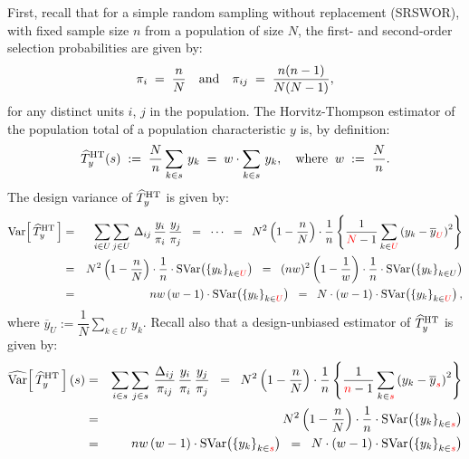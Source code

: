 First, recall that for a simple random sampling without replacement (SRSWOR),
with fixed sample size $n$ from a population of size $N$,
the first- and second-order selection probabilities are given by: 
\begin{equation*}
\pi_{i}\;=\;\dfrac{n}{N}
\quad\textnormal{and}\quad
\pi_{ij}\;=\;\dfrac{n(n-1)}{N(N-1)},
\end{equation*}
for any distinct units $i$, $j$ in the population.
The Horvitz-Thompson estimator of the population total of a population characteristic $y$ is, by definition:
\begin{equation*}
\widehat{T}^{\textnormal{HT}}_{y}(s)
\;:=\;\dfrac{N}{n}\sum_{k \in s}\,y_{k}
\;=\; w\cdot\sum_{k \in s}\,y_{k},
\quad\textnormal{where}\;\; w\;:=\;\dfrac{N}{n}.
\end{equation*}
The design variance of $\widehat{T}^{\textnormal{HT}}_{y}$ is given by:
\begin{eqnarray*}
\textnormal{Var}\!\left[\,\widehat{T}^{\textnormal{HT}}_{y}\,\right]
&=& \sum_{i\in U}\sum_{j\in U}\,\Delta_{ij}\,\frac{y_{i}}{\pi_{i}}\,\frac{y_{j}}{\pi_{j}}
\;\;=\;\; \cdots \;\;=\;\; N^{2}\left(1-\dfrac{n}{N}\right)\cdot\dfrac{1}{n}\left\{\dfrac{1}{{\color{red}N}-1}\sum_{k \in{\color{red}U}}\left(y_{k}-\overline{y}_{\color{red}U}\right)^{2}\right\} \\
&=& N^{2}\left(1-\dfrac{n}{N}\right)\cdot\dfrac{1}{n}\cdot\textnormal{SVar}\!\left(\left\{y_{k}\right\}_{k\in{\color{red}U}}\right)
\;\;=\;\; (nw)^{2}\left(1-\dfrac{1}{w}\right)\cdot\dfrac{1}{n}\cdot\textnormal{SVar}\!\left(\left\{y_{k}\right\}_{k\in U}\right) \\
&=& nw\left(w-1\right)\cdot\textnormal{SVar}\!\left(\left\{y_{k}\right\}_{k\in{\color{red}U}}\right)
\;\;=\;\; N\cdot\left(w-1\right)\cdot\textnormal{SVar}\!\left(\left\{y_{k}\right\}_{k\in{\color{red}U}}\right),
\end{eqnarray*}
where $\overline{y}_{U} := \dfrac{1}{N}\underset{k \in U}{\sum}\,y_{k}$.
Recall also that a design-unbiased estimator of $\widehat{T}^{\textnormal{HT}}_{y}$ is given by:
\begin{eqnarray*}
\widehat{\textnormal{Var}}\!\left[\,\widehat{T}^{\textnormal{HT}}_{y}\,\right](s)
&=& \sum_{i\in s}\sum_{j\in s}\,\dfrac{\Delta_{ij}}{\pi_{ij}}\,\frac{y_{i}}{\pi_{i}}\,\frac{y_{j}}{\pi_{j}}
\;\;=\;\; N^{2}\left(1-\dfrac{n}{N}\right)\cdot\dfrac{1}{n}\left\{\dfrac{1}{{\color{red}n}-1}\sum_{k \in{\color{red}s}}\left(y_{k}-\overline{y}_{\color{red}s}\right)^{2}\right\} \\
&=& N^{2}\left(1-\dfrac{n}{N}\right)\cdot\dfrac{1}{n}\cdot\textnormal{SVar}\!\left(\left\{y_{k}\right\}_{k\in{\color{red}s}}\right) \\
&=&
nw\left(w-1\right)\cdot\textnormal{SVar}\!\left(\left\{y_{k}\right\}_{k\in{\color{red}s}}\right)
\;\;=\;\;
N\cdot\left(w-1\right)\cdot\textnormal{SVar}\!\left(\left\{y_{k}\right\}_{k\in{\color{red}s}}\right)
\end{eqnarray*}
